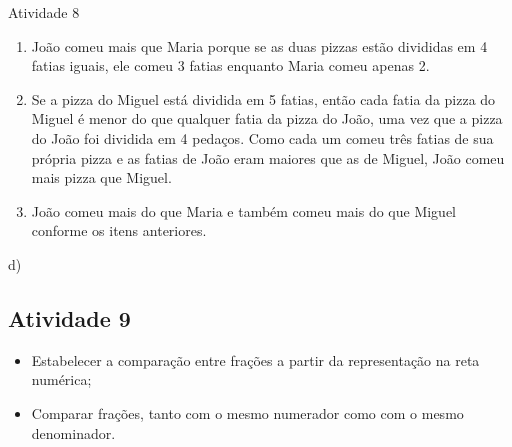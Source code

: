 \begin{multicols}{2}
\begin{resposta*}{Atividade 8}  
\begin{enumerate} [\quad a)] %
    \item       João comeu mais que Maria porque se as duas pizzas estão divididas em 4 fatias iguais, ele comeu 3 fatias enquanto Maria comeu apenas 2.
    \item       Se a pizza do Miguel está dividida em 5 fatias, então cada fatia da pizza do Miguel é menor do que qualquer fatia da pizza do João, uma vez que a pizza do João foi dividida em 4 pedaços. Como cada um comeu três fatias de sua própria pizza e as fatias de João eram maiores que as de Miguel, João comeu mais pizza que Miguel.
    \item       João comeu mais do que Maria e também comeu mais do que Miguel conforme os itens anteriores.
\end{enumerate} %
\quad \;d)    
     

 
 \end{resposta*}

\subsection{Atividade 9}

\begin{itemize} %
    \item       Estabelecer a comparação entre frações a partir da representação na reta numérica;
    \item       Comparar frações, tanto com o mesmo numerador como com o mesmo denominador.
\end{itemize} %


\end{multicols}
